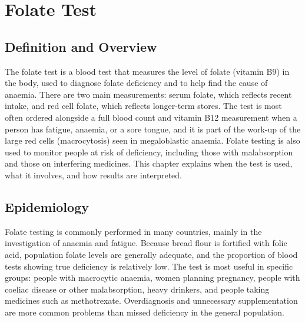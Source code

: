\chapter{Folate Test}

\section*{Definition and Overview}
The folate test is a blood test that measures the level of folate (vitamin B9) in the body, used to diagnose folate deficiency and to help find the cause of anaemia. There are two main measurements: serum folate, which reflects recent intake, and red cell folate, which reflects longer-term stores. The test is most often ordered alongside a full blood count and vitamin B12 measurement when a person has fatigue, anaemia, or a sore tongue, and it is part of the work-up of the large red cells (macrocytosis) seen in megaloblastic anaemia. Folate testing is also used to monitor people at risk of deficiency, including those with malabsorption and those on interfering medicines. This chapter explains when the test is used, what it involves, and how results are interpreted.

\section*{Epidemiology}
Folate testing is commonly performed in many countries, mainly in the investigation of anaemia and fatigue. Because bread flour is fortified with folic acid, population folate levels are generally adequate, and the proportion of blood tests showing true deficiency is relatively low. The test is most useful in specific groups: people with macrocytic anaemia, women planning pregnancy, people with coeliac disease or other malabsorption, heavy drinkers, and people taking medicines such as methotrexate. Overdiagnosis and unnecessary supplementation are more common problems than missed deficiency in the general population.

